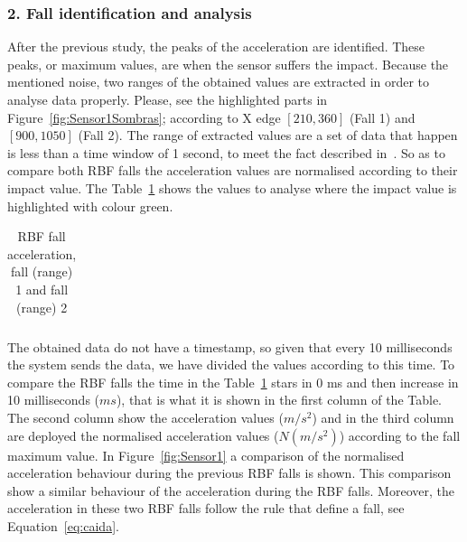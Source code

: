 \documentclass[conference]{IEEEtran}
\theoremstyle{definition}
\begin{document}
\subsubsection*{2. Fall identification and analysis} After the previous study, the peaks of the acceleration are identified. 
These peaks, or maximum values, are when the sensor suffers the impact. Because the mentioned noise, two ranges of the obtained 
values are extracted in order to analyse data properly. Please, see the highlighted parts in Figure~\ref{fig:Sensor1Sombras};
according to X edge $[210, 360]$ (Fall 1) and $[900, 1050]$ (Fall 2). The range of extracted values are a set of data that 
happen is less than a time window of 1 second, to meet the fact described in~\cite{Luder2009}. So as to compare both RBF falls
the acceleration values are normalised according to their impact value. The Table~\ref{tabla:RBF} 
shows the values to analyse where the impact value is highlighted with colour green.

\begin{table}[!h]
 \centering
 \begin{tabular}{*{5}{r}}
   
 \end{tabular}
 \caption{RBF fall acceleration, fall (range) 1 and fall (range) 2}%
 \label{tabla:RBF}
\end{table}

%       
%       

The obtained data do not have a timestamp, so given that every 10 milliseconds the system sends the data, we have
divided the values according to this time. To compare the RBF falls the time in the Table~\ref{tabla:RBF} 
stars in 0 ms and then increase in 10 milliseconds ($ms$), that is what it is shown in 
the first column of the Table. The second column show the acceleration values ($m/s^2$) and in the third column
are deployed the normalised acceleration values ($N(m/s^2)$) according to the fall maximum value. In 
Figure~\ref{fig:Sensor1} a comparison of the normalised acceleration behaviour during the previous RBF falls is shown. 
This comparison show a similar behaviour of the acceleration during the RBF falls.
Moreover, the acceleration in these two RBF falls follow the rule that define a fall, see Equation~\ref{eq:caida}.
\end{document}
